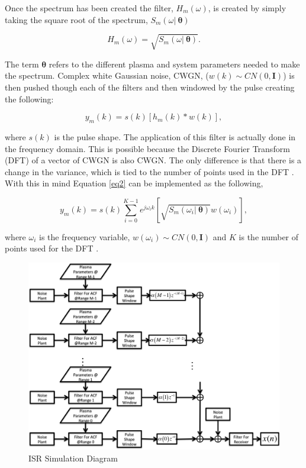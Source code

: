 \documentclass[draft,ras]{agutex}
\begin{document}
\begin{article}
Once the spectrum has been created the filter, $H_m(\omega)$, is created by simply taking the square root of the spectrum, $S_m(\omega | \: \bm{\theta})$

\begin{equation}
\label{eq1}
H_m(\omega) = \sqrt{S_m(\omega | \: \bm{\theta})}.
\end{equation}

\noindent The term $ \bm{\theta}$ refers to the different plasma and system parameters needed to make the spectrum. Complex white Gaussian noise, CWGN, ($w(k)\sim CN(0,\mathbf{I})$) is then pushed though each of the filters and then windowed by the pulse creating the following:   

\begin{equation}
\label{eq2}
y_m (k)= s(k)\left[h_m(k)*w(k)\right],
\end{equation}
 
\noindent where $s(k)$ is the pulse shape. The application of this filter is actually done in the frequency domain. This is possible because the Discrete Fourier Transform (DFT) of a vector of CWGN is also CWGN. The only difference is that there is a change in the variance, which is tied to the number of points used in the DFT \citep{kayvol1}. With this in mind Equation \ref{eq2} can be implemented as the following,

\begin{equation}
\label{eq:fftfilt}
y_m (k)= s(k)\displaystyle \sum_{i=0}^{K-1}e^{j\omega_ik}\left[ \sqrt{S_m(\omega_i | \: \bm{\theta})}w(\omega_i)\right],
\end{equation}

\noindent where $\omega_i$ is the frequency variable, $w(\omega_i) \sim CN(0,\mathbf{I})$ and $K$ is the number of points used for the DFT \citep{michellnoisesim1981}.

\begin{figure}[!h]
\centering
\includegraphics[width=7.0in]{diagram}
\caption{ISR Simulation Diagram}
\label{fig:isrdiag}
\end{figure}



\end{article}
\end{document}
